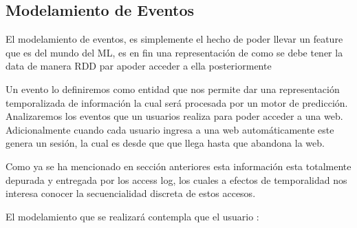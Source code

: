 






  \subsection{Modelamiento de Eventos}


El modelamiento de eventos, es simplemente el hecho de poder llevar un feature  que es del mundo del ML, es en fin una representación de como se debe tener la data de manera RDD par apoder acceder a ella posteriormente 

Un evento lo definiremos como entidad que nos permite dar una representación temporalizada de información la cual será procesada por un motor de predicción. Analizaremos los eventos que un usuarios realiza para poder acceder a una web. Adicionalmente cuando cada usuario ingresa a una web automáticamente este genera un sesión, la cual es desde que que llega hasta que abandona la web.

Como ya se ha mencionado en sección anteriores esta información esta totalmente depurada y entregada por los access log, los cuales a efectos de temporalidad nos interesa conocer la secuencialidad discreta de estos accesos.






  El modelamiento que se realizará contempla que el usuario :



